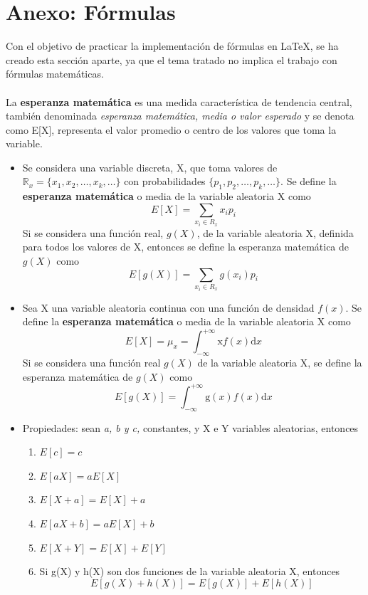\documentclass[11 pt]{article}
\begin{document}
\section{Anexo: Fórmulas}
Con el objetivo de practicar la implementación de fórmulas en LaTeX, se ha creado esta sección aparte, ya que el tema tratado no implica el trabajo con fórmulas matemáticas.\\\\
La {\bf esperanza matemática} es una medida característica de tendencia central, también denominada {\em esperanza matemática, media o valor esperado} y se denota como E[X], representa el valor promedio o centro de los valores que toma la variable. 
\begin{itemize}
	\item Se considera una variable discreta, X, que toma valores de $\mathbb{R}_x=\{x_1,x_2,\dots,x_k,\dots\}$ con probabilidades $\{p_1,p_2,\dots,p_k,\dots\}$. Se define la {\bf esperanza matemática} o media de la variable aleatoria X como
	\begin{displaymath}
	E[X]=\sum_{x_i\in R_x} x_ip_i
	\end{displaymath} 
	Si se considera una función real, $g(X)$, de la variable aleatoria X, definida para todos los valores de X, entonces se define la esperanza matemática de $g(X)$ como
	\begin{displaymath}
	E[g(X)]=\sum_{x_i\in R_x} g(x_i)p_i
	\end{displaymath} 
	\item Sea X una variable aleatoria continua con una función de densidad $f(x)$. Se define la {\bf esperanza matemática} o media de la variable aleatoria X como 
	\begin{displaymath}
	E[X]=\mu_x=\int_{-\infty}^{+\infty} \mathrm xf(x) \mathrm{d}x
	\end{displaymath}
	Si se considera una función real $g(X)$ de la variable aleatoria X, se define la esperanza matemática de  $g(X)$ como
		\begin{displaymath}
	E[g(X)]=\int_{-\infty}^{+\infty} \mathrm g(x)f(x) \mathrm{d}x
	\end{displaymath}
	\item Propiedades: sean {\em a, b y c,} constantes, y X e Y variables aleatorias, entonces
	\begin{enumerate}
		\item $E[c]=c$
		\item $E[aX]=aE[X]$
		\item $E[X+a]=E[X]+a$
		\item $E[aX+b]=aE[X]+b$
		\item $E[X+Y]=E[X]+E[Y]$
		\item Si g(X) y h(X) son dos funciones de la variable aleatoria X, entonces
		\begin{displaymath}
		E[g(X)+h(X)]=E[g(X)]+E[h(X)]
		\end{displaymath}	
	\end{enumerate}
\end{itemize} 
\end{document}
